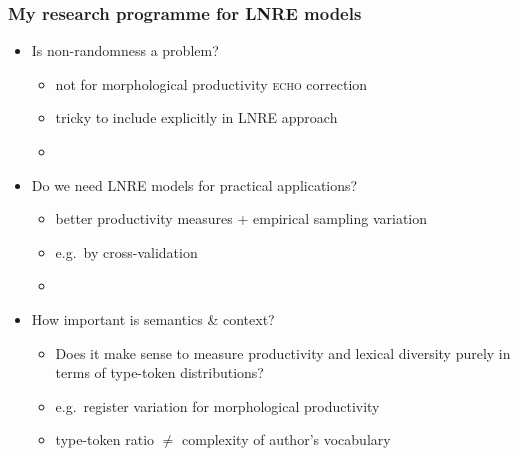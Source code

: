 \documentclass[t]{beamer} %
\begin{document}
\begin{frame}
  \frametitle{My research programme for LNRE models}

  \begin{itemize}
  \item<1-> Is non-randomness a problem?
    \begin{itemize}
    \item not for morphological productivity \so \textsc{echo} correction
    \item tricky to include explicitly in LNRE approach
    \item[]
    \end{itemize}
  \item<2-> Do we need LNRE models for practical applications?
    \begin{itemize}
    \item better productivity measures + empirical sampling variation
    \item e.g.\ by cross-validation \citep{Evert:Wankerl:Noeth:17}
    \item[]
    \end{itemize}
  \item<3-> How important is semantics \& context?
    \begin{itemize}
    \item Does it make sense to measure productivity and lexical diversity purely in terms of type-token distributions?
    \item e.g.\ register variation for morphological productivity
    \item type-token ratio $\neq$ complexity of author's vocabulary
    \end{itemize}
  \end{itemize}
\end{frame}


\begin{frame}[c]
  \begin{center}
  \end{center}
\end{frame}



\end{document}
